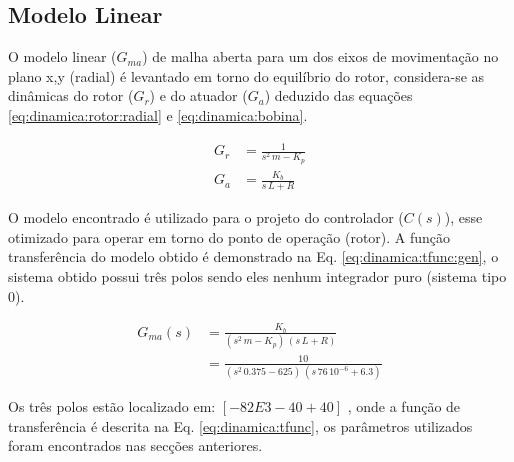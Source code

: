 \subsection{Modelo Linear}

O modelo linear ($G_{ma}$) de malha aberta para um dos eixos de movimentação no plano x,y (radial) é levantado em torno do equilíbrio do rotor, considera-se as dinâmicas do rotor ($G_r$) e do atuador ($G_a$) deduzido das equações  \eqref{eq:dinamica:rotor:radial} e \eqref{eq:dinamica:bobina}.

\begin{align}
	G_r &= \frac{1}{s^2 \, m - K_p} \\
	G_a &= \frac{K_b}{s\, L + R}
\end{align}

O modelo encontrado é utilizado para o projeto do controlador ($C(s)$), esse otimizado para operar em torno do ponto de operação (rotor). A função transferência do modelo obtido é demonstrado na Eq. \eqref{eq:dinamica:tfunc:gen}, o sistema obtido possui três polos sendo eles nenhum integrador puro (sistema tipo 0).  

\begin{align}
	G_{ma}(s) &= \frac{K_b}{(s^2 \, m - K_p) \, (s\, L + R)}	\label{eq:dinamica:tfunc:gen} \\
	&= \frac{10}{(s^2 \, 0.375 - 625) \, (s\, 76 \, 10^{-6} + 6.3)}
	 \label{eq:dinamica:tfunc}
\end{align}
 

Os três polos estão localizado em: $[-82E3 -40 +40]$ , onde a função de transferência é descrita na Eq. \eqref{eq:dinamica:tfunc}, os parâmetros utilizados foram encontrados nas secções anteriores. 



%	

